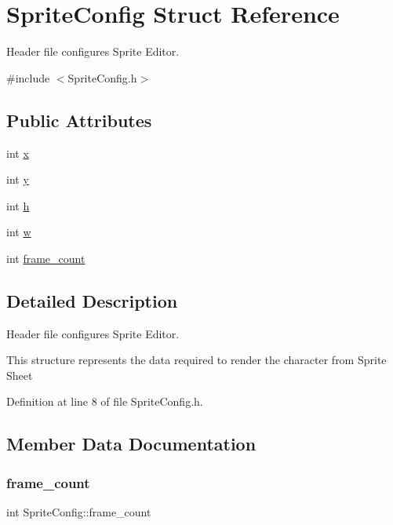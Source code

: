 \hypertarget{struct_sprite_config}{}\section{Sprite\+Config Struct Reference}
\label{struct_sprite_config}


Header file configures Sprite Editor.  




{\ttfamily \#include $<$Sprite\+Config.\+h$>$}

\subsection*{Public Attributes}
\begin{DoxyCompactItemize}
\item 
int \mbox{\hyperlink{struct_sprite_config_a14be384f5a3d4e341f25f39324085dc0}{x}}
\item 
int \mbox{\hyperlink{struct_sprite_config_af0995ec93785b40557108a845a03419e}{y}}
\item 
int \mbox{\hyperlink{struct_sprite_config_a88409cd34729d9d86faf6f89c83d1b30}{h}}
\item 
int \mbox{\hyperlink{struct_sprite_config_a5fa96384aee1bb0368f6e45f43ba8c20}{w}}
\item 
int \mbox{\hyperlink{struct_sprite_config_aa808a264e86ee3f3736e85d5570a4648}{frame\+\_\+count}}
\end{DoxyCompactItemize}


\subsection{Detailed Description}
Header file configures Sprite Editor. 

This structure represents the data required to render the character from Sprite Sheet 

Definition at line 8 of file Sprite\+Config.\+h.



\subsection{Member Data Documentation}
\mbox{\label{struct_sprite_config_aa808a264e86ee3f3736e85d5570a4648}} 
\subsubsection{\texorpdfstring{frame\_count}{frame\_count}}
{\footnotesize\ttfamily int Sprite\+Config\+::frame\+\_\+count}



